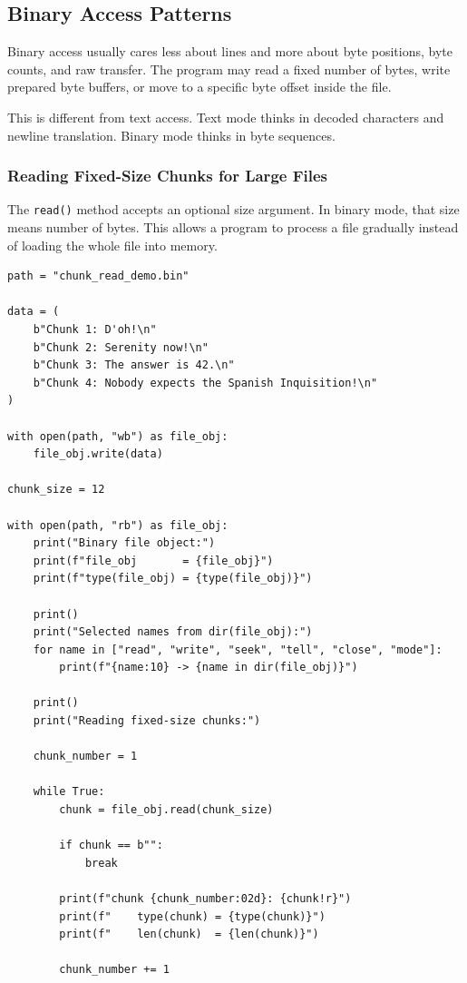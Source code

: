 \subsection{Binary Access Patterns}

Binary access usually cares less about lines and more about byte positions, byte counts, and raw transfer. The program may read a fixed number of bytes, write prepared byte buffers, or move to a specific byte offset inside the file.

This is different from text access. Text mode thinks in decoded characters and newline translation. Binary mode thinks in byte sequences.

\subsubsection{Reading Fixed-Size Chunks for Large Files}

The \texttt{read()} method accepts an optional size argument. In binary mode, that size means number of bytes. This allows a program to process a file gradually instead of loading the whole file into memory.

\begin{verbatim}
path = "chunk_read_demo.bin"

data = (
    b"Chunk 1: D'oh!\n"
    b"Chunk 2: Serenity now!\n"
    b"Chunk 3: The answer is 42.\n"
    b"Chunk 4: Nobody expects the Spanish Inquisition!\n"
)

with open(path, "wb") as file_obj:
    file_obj.write(data)

chunk_size = 12

with open(path, "rb") as file_obj:
    print("Binary file object:")
    print(f"file_obj       = {file_obj}")
    print(f"type(file_obj) = {type(file_obj)}")

    print()
    print("Selected names from dir(file_obj):")
    for name in ["read", "write", "seek", "tell", "close", "mode"]:
        print(f"{name:10} -> {name in dir(file_obj)}")

    print()
    print("Reading fixed-size chunks:")

    chunk_number = 1

    while True:
        chunk = file_obj.read(chunk_size)

        if chunk == b"":
            break

        print(f"chunk {chunk_number:02d}: {chunk!r}")
        print(f"    type(chunk) = {type(chunk)}")
        print(f"    len(chunk)  = {len(chunk)}")

        chunk_number += 1
\end{verbatim}

